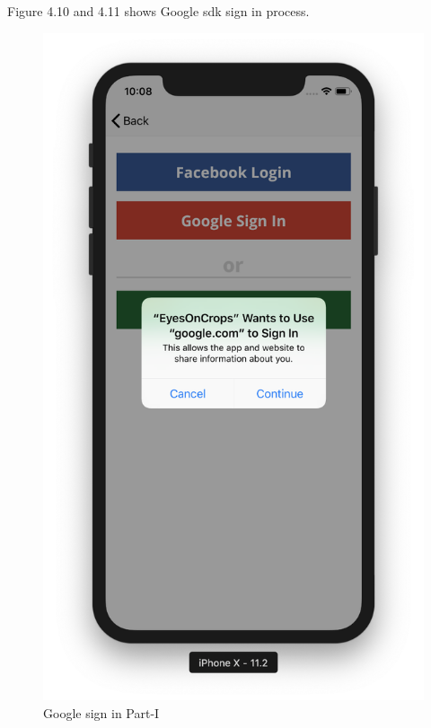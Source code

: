 \begin{itemize}
\begin{itemize}
        Figure 4.10 and 4.11 shows Google \gls{sdk} sign in process.
        
        \begin{figure}[!htb]
        \begin{minipage}{0.5\textwidth}
            \centering
            \includegraphics[width=0.8\linewidth]{figures/ch4/google_1.png}
            \caption{Google sign in Part-I}\label{Fig:google_part_1}
        \end{minipage}\hfill
        \begin{minipage}{0.5\textwidth}
            \centering

\end{minipage}
\end{figure}
\end{itemize}
\end{itemize}
